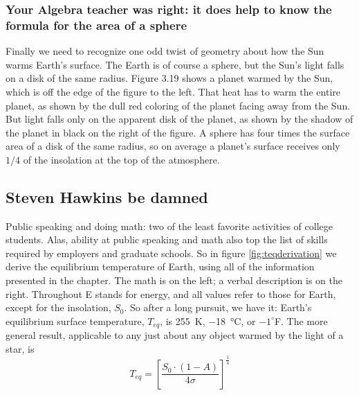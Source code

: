 \subsubsection{Your Algebra teacher was right: it does help to know the formula for the area of a sphere}
Finally we need to recognize one odd twist of geometry about how the Sun warms Earth's surface. The Earth is of course a sphere, but the Sun's light falls on a disk of the same radius. Figure 3.19 shows a planet warmed by the Sun, which is off the edge of the figure to the left. That heat has to warm the entire planet, as shown by the dull red coloring of the planet facing away from the Sun. But light falls only on the apparent disk of the planet, as shown by the shadow of the planet in black on the right of the figure. A sphere has four times the surface area of a disk of the same radius, so on average a planet's surface receives only $1/4$ of the insolation at the top of the atmosphere. 
\subsection{Steven Hawkins be damned}
Public speaking and doing math: two of the least favorite activities of college students. Alas, ability at public speaking and math also top the list of skills required by employers and graduate schools. So in figure \ref{fig:teqderivation} we derive the equilibrium temperature of Earth, using all of the information presented in the chapter. The math is on the left; a verbal description is on the right. Throughout E stands for energy, and all values refer to those for Earth, except for the insolation, $S_0$. So after a long pursuit, we have it: Earth's equilibrium surface temperature, $T_{eq}$, is \SI{255}{K}, \SI{-18}{\celsius}, or $-1^{\circ}$F. The more general result, applicable to any just about any object warmed by the light of a star, is
\begin{equation}
	T_{eq}=\left[\frac{S_0 \cdot (1-A)}{4 \sigma}\right]^{\frac{1}{4}}  \label{eq:teq}
\end{equation}
